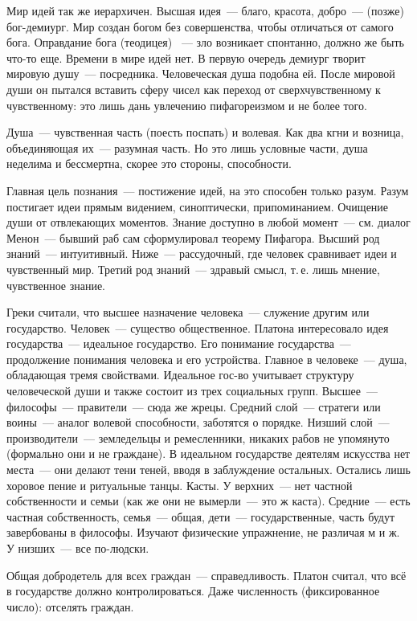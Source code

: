 Мир идей так же иерархичен. Высшая идея~--- благо, красота, добро~--- (позже) бог-демиург. Мир создан богом без совершенства, чтобы отличаться от самого бога. Оправдание бога (теодицея) ~--- зло возникает спонтанно, должно же быть что-то еще. 
Времени в мире идей нет. В первую очередь демиург творит мировую душу~--- посредника. Человеческая душа подобна ей. 
После мировой души он пытался вставить сферу чисел как переход от сверхчувственному к чувственному: это лишь дань увлечению пифагореизмом и не более того. 

Душа~--- чувственная часть (поесть поспать) и волевая. Как два кгни и возница, объединяющая их~--- разумная часть. Но это лишь условные части, душа неделима и бессмертна, скорее это стороны, способности. 

Главная цель познания~--- постижение идей, на это способен только разум. Разум постигает идеи прямым видением, синоптически, припоминанием. 
Очищение души от отвлекающих моментов. Знание доступно в любой момент~--- см. диалог Менон~--- бывший раб сам сформулировал теорему Пифагора. 
Высший род знаний~--- интуитивный. Ниже~--- рассудочный, где человек сравнивает идеи и чувственный мир. Третий род знаний~--- здравый смысл, т.\,е. лишь мнение, чувственное знание. 

Греки считали, что высшее назначение человека~--- служение другим или государство. Человек~--- существо общественное. 
Платона интересовало идея государства~--- идеальное государство. Его понимание государства~--- продолжение понимания человека и его устройства. Главное в человеке~--- душа, обладающая тремя свойствами. 
Идеальное гос-во учитывает структуру человеческой души и также состоит из трех социальных групп. Высшее~--- философы~--- правители~--- сюда же жрецы. Средний слой~--- стратеги или воины~--- аналог волевой способности, заботятся о порядке. 
Низший слой~--- производители~--- земледельцы и ремесленники, никаких рабов не упомянуто (формально они и не граждане). 
В идеальном государстве деятелям искусства нет места~--- они делают тени теней, вводя в заблуждение остальных. Остались лишь хоровое пение и ритуальные танцы. Касты. 
У верхних~--- нет частной собственности и семьи (как же они не вымерли~--- это ж каста). Средние~--- есть частная собственность, семья~--- общая, дети~--- государственные, часть будут завербованы в философы. 
Изучают физические упражнение, не различая м и ж. 
У низших~--- все по-людски. 

Общая добродетель для всех граждан~--- справедливость. 
Платон считал, что всё в государстве должно контролироваться. Даже численность (фиксированное число): отселять граждан. 

